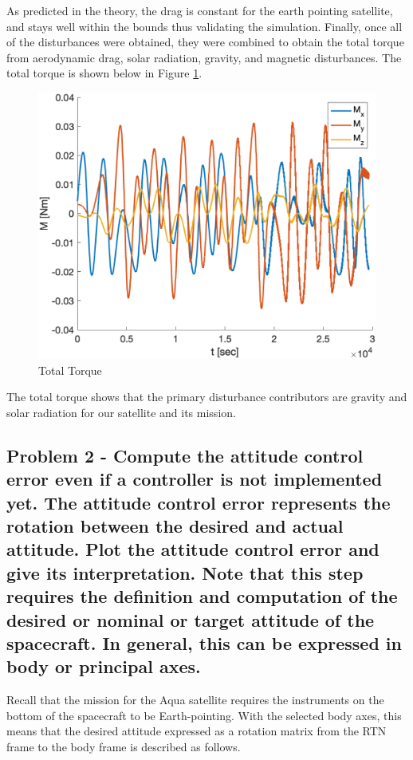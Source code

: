 As predicted in the theory, the drag is constant for the earth pointing satellite, and stays well within the bounds thus validating the simulation. Finally, once all of the disturbances were obtained, they were combined to obtain the total torque from aerodynamic drag, solar radiation, gravity, and magnetic disturbances. The total torque is shown below in Figure \ref{fig:all_torque}.

\begin{figure}[H]
    \centering
    \captionsetup{ justification = centering }
    \includegraphics[width = 12cm]{Images/PS6/all_torque.png}
    \caption{Total Torque}
    \label{fig:all_torque}
\end{figure}

The total torque shows that the primary disturbance contributors are gravity and solar radiation for our satellite and its mission. 

\subsection{Problem 2 - Compute the attitude control error even if a controller is not implemented yet. The attitude control error represents the rotation between the desired and actual attitude. Plot the attitude control error and give its interpretation. Note that this step requires the definition and computation of the desired or nominal or target attitude of the spacecraft. In general, this can be expressed in body or principal axes.}

Recall that the mission for the Aqua satellite requires the instruments on the bottom of the spacecraft to be Earth-pointing. With the selected body axes, this means that the desired attitude expressed as a rotation matrix from the RTN frame to the body frame is described as follows.


